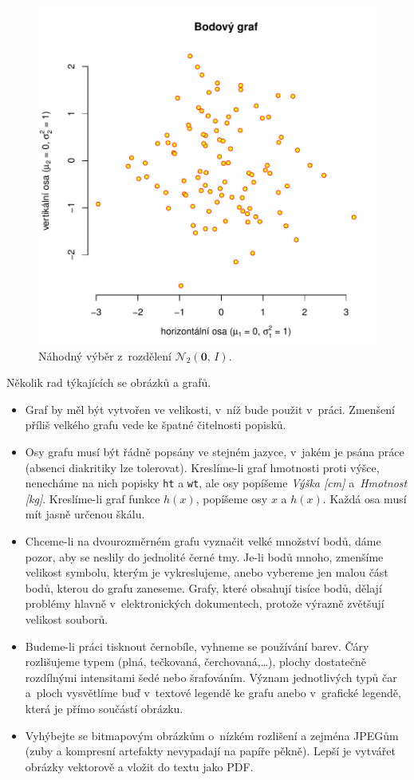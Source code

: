 \begin{figure}[htbp!]\centering
\includegraphics[width=.66\textwidth]{img/ukazka-obr01}
\caption{Náhodný výběr z~rozdělení $\mathcal{N}_2(\boldsymbol{0},\,I)$.}
\label{obr03:Nvyber}
\end{figure}

Několik rad týkajících se obrázků a grafů.

\begin{itemize}
\item Graf by měl být vytvořen ve velikosti, v~níž bude použit
  v~práci. Zmenšení příliš velkého grafu vede ke špatné čitelnosti
  popisků.
\item Osy grafu musí být řádně popsány ve stejném jazyce, v~jakém je
  psána práce (absenci diakritiky lze tolerovat). Kreslíme-li graf
  hmotnosti proti výšce, nenecháme na nich popisky \texttt{ht} a
  \texttt{wt}, ale osy popíšeme \emph{Výška [cm]} a~\emph{Hmotnost
    [kg]}. Kreslíme-li graf funkce $h(x)$, popíšeme osy $x$ a $h(x)$.
  Každá osa musí mít jasně určenou škálu.
\item Chceme-li na dvourozměrném grafu vyznačit velké množství bodů,
  dáme pozor, aby se neslily do jednolité černé tmy. Je-li bodů mnoho,
  zmenšíme velikost symbolu, kterým je vykreslujeme, anebo vybereme
  jen malou část bodů, kterou do grafu zaneseme. Grafy, které obsahují
  tisíce bodů, dělají problémy hlavně v~elektronických dokumentech,
  protože výrazně zvětšují velikost souborů.
\item Budeme-li práci tisknout černobíle, vyhneme se používání barev.
  Čáry roz\-li\-šu\-je\-me typem (plná, tečkovaná, čerchovaná,\ldots), plochy
  dostatečně roz\-díl\-ný\-mi intensitami šedé nebo šrafováním. Význam
  jednotlivých typů čar a~ploch vysvětlíme buď v~textové legendě ke
  grafu anebo v~grafické legendě, která je přímo součástí obrázku.
\item Vyhýbejte se bitmapovým obrázkům o~nízkém rozlišení a zejména
  JPEGům (zuby a kompresní artefakty nevypadají na papíře pěkně).
  Lepší je vytvářet obrázky vektorově a vložit do textu jako PDF.
\end{itemize}


